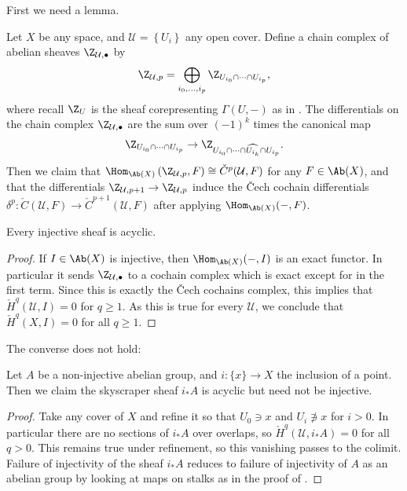 \documentclass[11pt]{amsart}
\begin{document}
First we need a lemma.
\begin{lemma} Let $X$ be any space, and $\mathcal{U} = \left\{ U_i \right\}$ any open cover. Define a chain complex of abelian sheaves $\Z_{\mathcal{U},\bullet}$ by
\begin{align*}
    \Z_{\mathcal{U},p} = \bigoplus_{i_0, \ldots, i_p} \Z_{U_{i_0}\cap \cdots \cap U_{i_p}},
\end{align*}
where recall $\Z_U$ is the sheaf corepresenting $\Gamma(U,-)$ as in . The differentials on the chain complex $\Z_{\mathcal{U},\bullet}$ are the sum over $(-1)^k$ times the canonical map
\begin{align*}
    \Z_{U_{i_0}\cap \cdots \cap U_{i_p}} \to \Z_{U_{i_0}\cap \cdots\cap \widehat{U_{i_k}} \cap U_{i_p}}.
\end{align*}
Then we claim that $\Hom_{\Ab(X)} \left( \Z_{\mathcal{U},p},F \right)\cong \check{C}^p(\mathcal{U},F)$ for any $F\in \Ab(X)$, and that the differentials $\Z_{\mathcal{U},p+1} \to \Z_{\mathcal{U},p}$ induce the \v{C}ech cochain differentials $\delta^p \colon \check{C}(\mathcal{U},F) \to \check{C}^{p+1}(\mathcal{U},F)$ after applying $\Hom_{\Ab(X)}(-,F)$.
\end{lemma}

\begin{corollary}\label{cor:injective-sheaf-is-acyclic} 
Every injective sheaf is acyclic.
\end{corollary}
\begin{proof} If $I \in \Ab(X)$ is injective, then $\Hom_{\Ab(X)}(-,I)$ is an exact functor. In particular it sends $\Z_{\mathcal{U},\bullet}$ to a cochain complex which is exact except for in the first term. Since this is exactly the \v{C}ech cochains complex, this implies that $\check{H}^q(\mathcal{U},I) = 0$ for $q\ge 1$. As this is true for every $\mathcal{U}$, we conclude that $\check{H}^q(X,I) = 0$ for all $q\ge 1$.
\end{proof}

The converse does not hold:

\begin{example} Let $A$ be a non-injective abelian group, and $i \colon \{x\} \to X$ the inclusion of a point. Then we claim the skyscraper sheaf $i_\ast A$ is acyclic but need not be injective.
\end{example}
\begin{proof} Take any cover of $X$ and refine it so that $U_0\ni x$ and $U_i\not\ni x$ for $i>0$. In particular there are no sections of $i_\ast A$ over overlaps, so $\check{H}^q(\mathcal{U},i_\ast A) = 0$ for all $q>0$. This remains true under refinement, so this vanishing passes to the colimit. Failure of injectivity of the sheaf $i_\ast A$ reduces to failure of injectivity of $A$ as an abelian group by looking at maps on stalks as in the proof of .
\end{proof}
\end{document}
